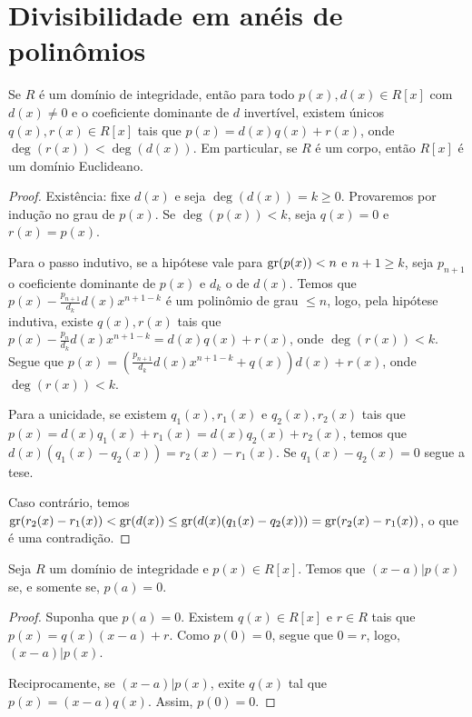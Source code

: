 \section{Divisibilidade em anéis de polinômios}
\begin{prop}
Se $R$ é um domínio de integridade, então para todo $p(x), d(x) \in R[x]$ com $d(x)\neq 0$ e o coeficiente dominante de $d$ invertível, existem únicos $q(x), r(x) \in R[x]$ tais que $p(x)=d(x)q(x)+r(x)$, onde $\deg(r(x))<\deg(d(x))$.
Em particular, se $R$ é um corpo, então $R[x]$ é um domínio Euclideano.
\end{prop}
\begin{proof}
    Existência: fixe $d(x)$ e seja $\deg(d(x))=k\geq 0$.
    Provaremos por indução no grau de $p(x)$.
    Se $\deg(p(x))<k$, seja $q(x)=0$ e $r(x)=p(x)$.

    Para o passo indutivo, se a hipótese vale para $\operatorname{gr}(p(x))<n$ e $n+1\geq k$, seja $p_{n+1}$ o coeficiente dominante de $p(x)$ e $d_k$ o de $d(x)$.
    Temos que $p(x)-\frac{p_{n+1}}{d_k}d(x)x^{n+1-k}$ é um polinômio de grau $\leq n$, logo, pela hipótese indutiva, existe $q(x), r(x)$ tais que $p(x)-\frac{p_n}{d_k}d(x)x^{n+1-k}=d(x)q(x)+r(x)$, onde $\deg(r(x))<k$.
    Segue que $p(x)=(\frac{p_{n+1}}{d_k}d(x)x^{n+1-k}+q(x))d(x)+r(x)$, onde $\deg(r(x))<k$.

    Para a unicidade, se existem $q_1(x), r_1(x)$ e $q_2(x), r_2(x)$ tais que $p(x)=d(x)q_1(x)+r_1(x)=d(x)q_2(x)+r_2(x)$, temos que $d(x)(q_1(x)-q_2(x))=r_2(x)-r_1(x)$.
    Se $q_1(x)-q_2(x)=0$ segue a tese.

    Caso contrário, temos $\operatorname{gr}(r_2(x)-r_1(x))<\operatorname{gr}(d(x))\leq\operatorname{gr}(d(x)(q_1(x)-q_2(x)))=\operatorname{gr}(r_2(x)-r_1(x))$, o que é uma contradição.
\end{proof}

\begin{prop}
    Seja $R$ um domínio de integridade e $p(x)\in R[x]$.
    Temos que $(x-a)|p(x)$ se, e somente se, $p(a)=0$.
\end{prop}
\begin{proof}
    Suponha que $p(a)=0$. Existem $q(x)\in R[x]$ e $r \in R$ tais que $p(x)=q(x)(x-a)+r$.
    Como $p(0)=0$, segue que $0=r$, logo, $(x-a)|p(x)$.

    Reciprocamente, se $(x-a)|p(x)$, exite $q(x)$ tal que $p(x)=(x-a)q(x)$. Assim, $p(0)=0$.
\end{proof}

